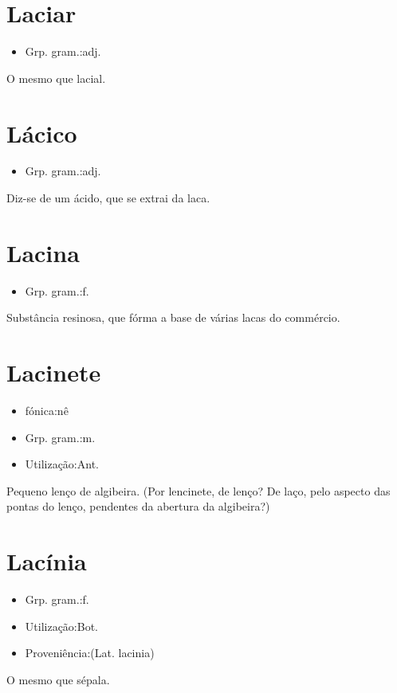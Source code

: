 \section{Laciar}
\begin{itemize}
\item {Grp. gram.:adj.}
\end{itemize}
O mesmo que \textunderscore lacial\textunderscore .
\section{Lácico}
\begin{itemize}
\item {Grp. gram.:adj.}
\end{itemize}
Diz-se de um ácido, que se extrai da laca.
\section{Lacina}
\begin{itemize}
\item {Grp. gram.:f.}
\end{itemize}
Substância resinosa, que fórma a base de várias lacas do commércio.
\section{Lacinete}
\begin{itemize}
\item {fónica:nê}
\end{itemize}
\begin{itemize}
\item {Grp. gram.:m.}
\end{itemize}
\begin{itemize}
\item {Utilização:Ant.}
\end{itemize}
Pequeno lenço de algibeira.
(Por \textunderscore lencinete\textunderscore , de \textunderscore lenço\textunderscore ? De \textunderscore laço\textunderscore , pelo aspecto das pontas do lenço, pendentes da abertura da algibeira?)
\section{Lacínia}
\begin{itemize}
\item {Grp. gram.:f.}
\end{itemize}
\begin{itemize}
\item {Utilização:Bot.}
\end{itemize}
\begin{itemize}
\item {Proveniência:(Lat. \textunderscore lacinia\textunderscore )}
\end{itemize}
O mesmo que \textunderscore sépala\textunderscore .
